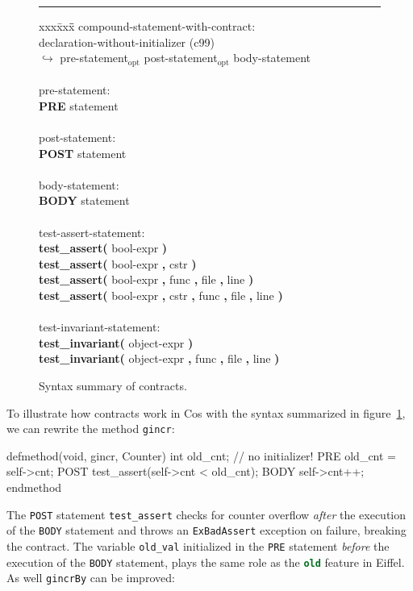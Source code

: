 \documentclass[preprint,10pt]{sigplanconf}
\newcommand{\ProgLang}[1]{{\sc #1}\xspace}
\newcommand{\Cos}       {\ProgLang{Cos}}
\newcommand{\Eiffel}    {\ProgLang{Eiffel}}
\newcommand{\ttb}[1]{{\normalfont\ttfamily\bfseries #1}}
\newcommand{\opt}{\ensuremath{_{\text{opt}}}\xspace}
\newcommand{\lnk}{\ensuremath{\hookrightarrow}\xspace}
\newcommand{\hr}{\rule{\columnwidth}{0.33pt}}
\newcommand{\code}[1]{\lstinline[language=COS,style=samplecode]|#1|}
\newcommand{\eiffelcode}[1]{\lstinline[language=Eiffel,style=samplecode]|#1|}
\begin{document}
\begin{figure}\hr
\begin{center}
{\em
\begin{tabbing}
xxx\= xxx\= \hspace*{19em}\= \kill
compound-statement-with-contract: \\
\> declaration-without-initializer 	\>\> (c99) \\ \lnk
\> pre-statement\opt post-statement\opt body-statement \\
\\
pre-statement: \\
\> \ttb{PRE} statement \\
\\
post-statement: \\
\> \ttb{POST} statement \\
\\
body-statement: \\
\> \ttb{BODY} statement \\
\\
test-assert-statement: \\
\> \ttb{test\_assert(} bool-expr \ttb{)} \\
\> \ttb{test\_assert(} bool-expr \ttb{,} cstr \ttb{)} \\
\> \ttb{test\_assert(} bool-expr \ttb{,} func \ttb{,} file \ttb{,} line \ttb{)} \\
\> \ttb{test\_assert(} bool-expr \ttb{,} cstr \ttb{,} func \ttb{,} file \ttb{,} line \ttb{)} \\
\\
test-invariant-statement: \\
\> \ttb{test\_invariant(} object-expr \ttb{)} \\
\> \ttb{test\_invariant(} object-expr \ttb{,} func \ttb{,} file \ttb{,} line \ttb{)}
\end{tabbing}}
\end{center}
\caption{Syntax summary of contracts.\label{fig:ctrgram}}
\end{figure}

To illustrate how contracts work in \Cos with the syntax summarized in figure~\ref{fig:ctrgram}, we can rewrite the method \code{gincr}:
\begin{COS}
defmethod(void, gincr, Counter)
  int  old_cnt; // no initializer!
  PRE  old_cnt = self->cnt;
  POST test_assert(self->cnt < old_cnt);
  BODY self->cnt++;
endmethod
\end{COS}
The \code{POST} statement \code{test_assert} checks for counter overflow {\em after} the execution of the \code{BODY} statement and throws an \code{ExBadAssert} exception on failure, breaking the contract. The variable \code{old_val} initialized in the \code{PRE} statement {\em before} the execution of the \code{BODY} statement, plays the same role as the \eiffelcode{old} feature in \Eiffel. As well \code{gincrBy} can be improved:
\end{document}
